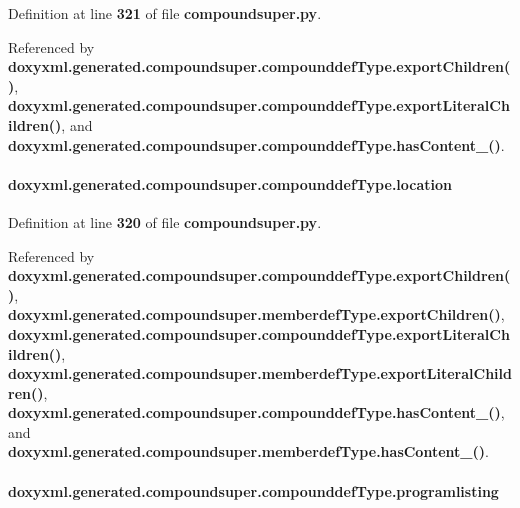Definition at line {\bf 321} of file {\bf compoundsuper.\+py}.



Referenced by {\bf doxyxml.\+generated.\+compoundsuper.\+compounddef\+Type.\+export\+Children()}, {\bf doxyxml.\+generated.\+compoundsuper.\+compounddef\+Type.\+export\+Literal\+Children()}, and {\bf doxyxml.\+generated.\+compoundsuper.\+compounddef\+Type.\+has\+Content\+\_\+()}.

\paragraph[{location}]{\setlength{\rightskip}{0pt plus 5cm}doxyxml.\+generated.\+compoundsuper.\+compounddef\+Type.\+location}\label{classdoxyxml_1_1generated_1_1compoundsuper_1_1compounddefType_a07d26ecad44a6b34a4e57330bcf63d75}


Definition at line {\bf 320} of file {\bf compoundsuper.\+py}.



Referenced by {\bf doxyxml.\+generated.\+compoundsuper.\+compounddef\+Type.\+export\+Children()}, {\bf doxyxml.\+generated.\+compoundsuper.\+memberdef\+Type.\+export\+Children()}, {\bf doxyxml.\+generated.\+compoundsuper.\+compounddef\+Type.\+export\+Literal\+Children()}, {\bf doxyxml.\+generated.\+compoundsuper.\+memberdef\+Type.\+export\+Literal\+Children()}, {\bf doxyxml.\+generated.\+compoundsuper.\+compounddef\+Type.\+has\+Content\+\_\+()}, and {\bf doxyxml.\+generated.\+compoundsuper.\+memberdef\+Type.\+has\+Content\+\_\+()}.

\paragraph[{programlisting}]{\setlength{\rightskip}{0pt plus 5cm}doxyxml.\+generated.\+compoundsuper.\+compounddef\+Type.\+programlisting}\label{classdoxyxml_1_1generated_1_1compoundsuper_1_1compounddefType_a1d7171fb4fee1810c6cf80d01e36462f}


